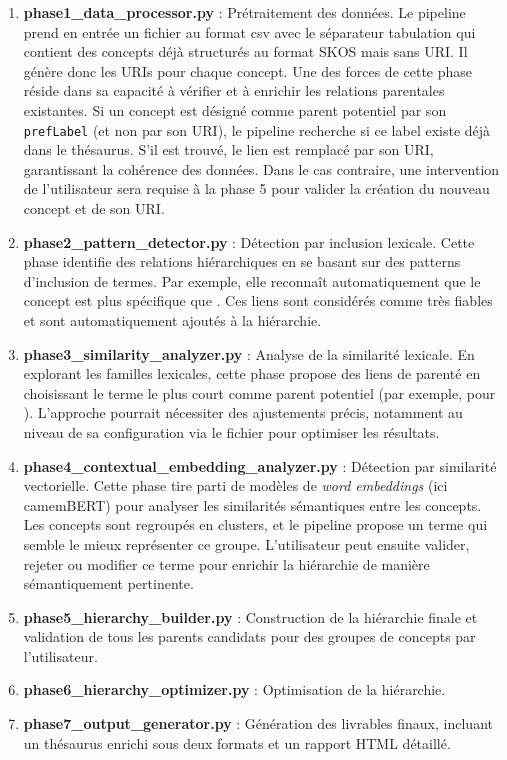 \begin{enumerate}
	\item \textbf{phase1\_data\_processor.py} : Prétraitement des données. Le pipeline prend en entrée un fichier au format \gls{csv} avec le séparateur tabulation qui contient des concepts déjà structurés au format SKOS mais sans URI. Il génère donc les URIs pour chaque concept. Une des forces de cette phase réside dans sa capacité à vérifier et à enrichir les relations parentales existantes. Si un concept est désigné comme parent potentiel par son \texttt{prefLabel} (et non par son URI), le pipeline recherche si ce label existe déjà dans le thésaurus. S'il est trouvé, le lien est remplacé par son URI, garantissant la cohérence des données. Dans le cas contraire, une intervention de l'utilisateur sera requise à la phase 5 pour valider la création du nouveau concept et de son URI.
	
	\item \textbf{phase2\_pattern\_detector.py} : Détection par inclusion lexicale. Cette phase identifie des relations hiérarchiques en se basant sur des patterns d'inclusion de termes. Par exemple, elle reconnaît automatiquement que le concept  est plus spécifique que . Ces liens sont considérés comme très fiables et sont automatiquement ajoutés à la hiérarchie.
	
	\item \textbf{phase3\_similarity\_analyzer.py} : Analyse de la similarité lexicale. En explorant les familles lexicales, cette phase propose des liens de parenté en choisissant le terme le plus court comme parent potentiel (par exemple,  pour ). L'approche pourrait nécessiter des ajustements précis, notamment au niveau de sa configuration via le fichier  pour optimiser les résultats.
	
	\item \textbf{phase4\_contextual\_embedding\_analyzer.py} : Détection par similarité vectorielle. Cette phase tire parti de modèles de \textit{word embeddings} (ici camemBERT) pour analyser les similarités sémantiques entre les concepts. Les concepts sont regroupés en clusters, et le pipeline propose un terme qui semble le mieux représenter ce groupe. L'utilisateur peut ensuite valider, rejeter ou modifier ce terme pour enrichir la hiérarchie de manière sémantiquement pertinente.
	
	\item \textbf{phase5\_hierarchy\_builder.py} : Construction de la hiérarchie finale et validation de tous les parents candidats pour des groupes de concepts par l'utilisateur.
	
	\item \textbf{phase6\_hierarchy\_optimizer.py} : Optimisation de la hiérarchie.
	
	\item \textbf{phase7\_output\_generator.py} : Génération des livrables finaux, incluant un thésaurus enrichi sous deux formats et un rapport HTML détaillé.

\end{enumerate}

